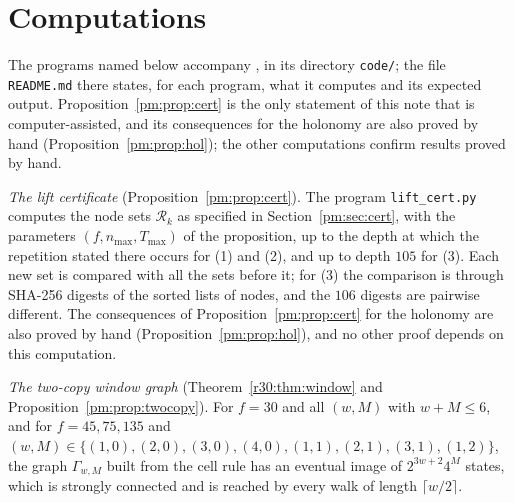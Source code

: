 \section{Computations}\label{tc:sec:comp}

The programs named below accompany \cite{PaperB}, in its directory \texttt{code/}; the file \texttt{README.md} there states, for each program, what it computes and its expected output. Proposition~\ref{pm:prop:cert} is the only statement of this note that is computer-assisted, and its consequences for the holonomy are also proved by hand (Proposition~\ref{pm:prop:hol}); the other computations confirm results proved by hand.

\emph{The lift certificate} (Proposition~\ref{pm:prop:cert}). The program \texttt{lift\_cert.py} computes the node sets $\mathcal R_k$ as specified in Section~\ref{pm:sec:cert}, with the parameters $(f,n_{\max},T_{\max})$ of the proposition, up to the depth at which the repetition stated there occurs for (1) and (2), and up to depth $105$ for (3). Each new set is compared with all the sets before it; for (3) the comparison is through SHA-256 digests of the sorted lists of nodes, and the $106$ digests are pairwise different. The consequences of Proposition~\ref{pm:prop:cert} for the holonomy are also proved by hand (Proposition~\ref{pm:prop:hol}), and no other proof depends on this computation.

\emph{The two-copy window graph} (Theorem~\ref{r30:thm:window} and Proposition~\ref{pm:prop:twocopy}). For $f=30$ and all $(w,M)$ with $w+M\le6$, and for $f=45,75,135$ and $(w,M)\in\{(1,0),(2,0),(3,0),(4,0),(1,1),(2,1),(3,1),(1,2)\}$, the graph $\Gamma_{w,M}$ built from the cell rule has an eventual image of $2^{3w+2}4^M$ states, which is strongly connected and is reached by every walk of length $\lceil w/2\rceil$.

